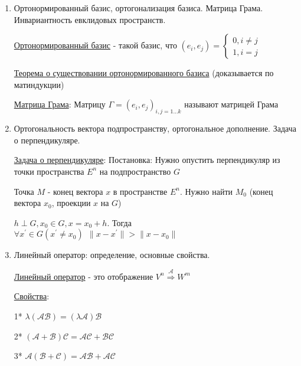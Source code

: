 \documentclass[12pt]{article}
\begin{document}
\begin{enumerate}
        \item Ортонормированный базис, ортогонализация базиса. Матрица Грама. Инвариантность евклидовых пространств.

        \hyperlink{ortonormalizedbasis}{Ортонормированный базис} - такой базис, что $(e_i, e_j) = \begin{cases}
                                                                                                      0, i \neq j \\ 1, i = j
        \end{cases}$

        \hyperlink{orthogonalbasisinspace}{Теорема о существовании ортонормированного базиса} (доказывается по матиндукции)


        \hyperlink{grammatrix}{Матрица Грама}: Матрицу $\Gamma = {(e_i, e_j)}_{i, j = 1\dots k}$ называют матрицей Грама

        \item Ортогональность вектора подпространству, ортогональное дополнение. Задача о перпендикуляре.

        \hyperlink{perpendicularproblem}{Задача о перпендикуляре}: Постановка: Нужно опустить перпендикуляр из точки пространства $E^n$ на подпространство $G$

        Точка $M$ - конец вектора $x$ в пространстве $E^n$.
        Нужно найти $M_0$ (конец вектора $x_0$, проекции $x$ на $G$)

        \begin{MyTheorem}
            \Ths $h \perp G, x_0 \in G, x = x_0 + h$. Тогда $\forall x^\prime \in G (x^\prime \neq x_0) \ \ \|x - x^\prime\| > \|x - x_0\|$
        \end{MyTheorem}

        \item Линейный оператор: определение, основные свойства.

        \hyperlink{linearoperatordefinition}{Линейный оператор} - это отображение $V^n \stackrel{\mathcal{A}}{\Longrightarrow} W^m$

        \hyperlink{linearoperatorproperties}{Свойства}:

        1* $\lambda (\mathcal{A}\mathcal{B}) = (\lambda \mathcal{A})\mathcal{B}$

        2* $(\mathcal{A} + \mathcal{B}) \mathcal{C} = \mathcal{A}\mathcal{C} + \mathcal{B}\mathcal{C}$

        3* $\mathcal{A} (\mathcal{B} + \mathcal{C}) = \mathcal{A}\mathcal{B} + \mathcal{A}\mathcal{C}$


\end{enumerate}
\end{document}
